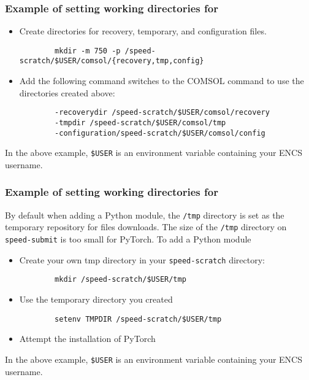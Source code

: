 \subsubsection{Example of setting working directories for }
\begin{itemize}
	\item Create directories for recovery, temporary, and configuration files.
	\begin{verbatim}
		mkdir -m 750 -p /speed-scratch/$USER/comsol/{recovery,tmp,config}
	\end{verbatim}
	\item Add the following command switches to the COMSOL command to use the directories created above:
	\begin{verbatim}
		-recoverydir /speed-scratch/$USER/comsol/recovery
		-tmpdir /speed-scratch/$USER/comsol/tmp
		-configuration/speed-scratch/$USER/comsol/config
	\end{verbatim}
\end{itemize}
\noindent In the above example, \verb!$USER! is an environment variable containing your ENCS username.

\subsubsection{Example of setting working directories for }
By default when adding a Python module, the \texttt{/tmp} directory is set as the temporary repository for files downloads.
The size of the \texttt{/tmp} directory on \verb!speed-submit! is too small for PyTorch.
To add a Python module
\begin{itemize}
    \item Create your own tmp directory in your \verb!speed-scratch! directory:
	\begin{verbatim}
  		mkdir /speed-scratch/$USER/tmp
	\end{verbatim}
	\item Use the temporary directory you created
	\begin{verbatim}
  		setenv TMPDIR /speed-scratch/$USER/tmp
	\end{verbatim}
    \item Attempt the installation of PyTorch
\end{itemize}
\noindent In the above example, \verb!$USER! is an environment variable containing your ENCS username.


